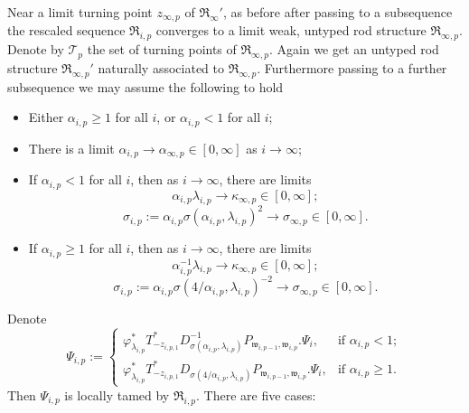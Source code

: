 \documentclass[a4paper,11pt]{amsart}
\theoremstyle{definition}
\numberwithin{equation}{section}
\newcommand{\mw} {\mathfrak w}
\newcommand{\mR} {\mathfrak R}
\begin{document}
Near a limit turning point $z_{\infty, p}$ of $\mR_{\infty}'$, as before after passing to a subsequence the rescaled sequence $\mR_{i, p}$ converges to a limit  weak, untyped rod structure $\mR_{\infty, p}$. Denote by $\mathcal T_{p}$ the set of turning points of $\mR_{\infty, p}$. Again we get an untyped rod structure $\mR_{\infty, p}'$ naturally associated to $\mR_{\infty, p}$. Furthermore passing to a further subsequence we may assume the following to hold
\begin{itemize}
\item Either $\alpha_{i, p}\geq 1$ for all $i$, or $\alpha_{i, p}<1$ for all $i$; 
\item There is a limit $\alpha_{i, p}\rightarrow\alpha_{\infty, p}\in [0, \infty]$ as $i\rightarrow\infty$;
\item If $\alpha_{i, p}<1$ for all $i$, then as $i\rightarrow\infty$, there are limits  $$\alpha_{i,p}\lambda_{i, p}\rightarrow \kappa_{\infty, p}\in [0, \infty];$$ 
\begin{equation}\label{eqn:definition of sigma ip}\sigma_{i,p}:=\alpha_{i, p}\sigma(\alpha_{i, p}, \lambda_{i, p})^2\rightarrow\sigma_{\infty, p}\in [0, \infty].
\end{equation}
\item If $\alpha_{i, p}\geq 1$ for all $i$,   then as $i\rightarrow\infty$, there are limits  
$$\alpha_{i, p}^{-1}\lambda_{i, p}\rightarrow \kappa_{\infty, p}\in [0, \infty];
$$
$$\sigma_{i,p}:=\alpha_{i, p}\sigma(4/\alpha_{i, p}, \lambda_{i, p})^{-2}\rightarrow\sigma_{\infty, p}\in [0, \infty].$$ 
\end{itemize}
Denote
\begin{equation}
  \Psi_{i, p}:=\begin{cases}
      \varphi_{\lambda_{i, p}}^*T_{-z_{i,p,1}}^* D_{\sigma(\alpha_{i, p}, \lambda_{i, p})}^{-1}P_{\mw_{i,p-1},\mw_{i,p}}.\Psi_{i}, & \text{if }\alpha_{i,p}<1;\\
      \varphi_{\lambda_{i, p}}^*T_{-z_{i,p,1}}^*D_{\sigma(4/\alpha_{i,p},\lambda_{i,p})} P_{\mw_{i,p-1},\mw_{i,p}}.\Psi_i, & \text{if }\alpha_{i,p}\geq1.
  \end{cases}  
\end{equation}
Then $\Psi_{i, p}$ is locally tamed by $\mR_{i, p}$.
There are five cases:
\end{document}

